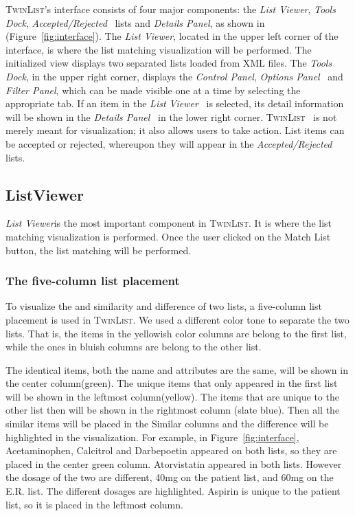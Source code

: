 \documentclass{chi2009}
\newcommand{\TwinList}{\textsc{TwinList}}
\newcommand{\ListViewer}{\textit{List Viewer}}
\newcommand{\AcceptedRejected}{\textit{Accepted/Rejected}}
\newcommand{\Details}{\textit{Details Panel}}
\newcommand{\Tools}{\textit{Tools Dock}}
\newcommand{\Controls}{\textit{Control Panel}}
\newcommand{\Filters}{\textit{Filter Panel}}
\newcommand{\Options}{\textit{Options Panel}}
\begin{document}
\TwinList's interface consists of four major components: the \ListViewer, \Tools, \AcceptedRejected~ lists and \Details, as shown in (Figure~\ref{fig:interface}). The \ListViewer, located in the upper left corner of the interface, is where the list matching visualization will be performed. The initialized view displays two separated lists loaded from XML files. The \Tools, in the upper right corner, displays the \Controls, \Options~ and \Filters, which can be made visible one at a time by selecting the appropriate tab. If an item in the \ListViewer~ is selected, its detail information will be shown in the \Details~ in the lower right corner. \TwinList~ is not merely meant for visualization; it also allows users to take action. List items can be accepted or rejected, whereupon they will appear in the \AcceptedRejected~ lists.

\subsection{ListViewer}
 \ListViewer is the most important component in \TwinList. It is where the list matching visualization is performed. Once the user clicked on the Match List button, the list matching will be performed.

\subsubsection{The five-column list placement}
To visualize the and similarity and difference of two lists, a five-column list placement is used in \TwinList. We used a different color tone to separate the two lists. That is, the items in the yellowish color columns are belong to the first list, while the ones in bluish columns are belong to the other list. 

The identical items, both the name and attributes are the same, will be shown in the center column(green). The unique items that only appeared in the first list will be shown in the leftmost column(yellow). The items that are unique to the other list then will be shown in the rightmost column (slate blue). Then all the similar items will be placed in the Similar columns and the difference will be highlighted in the visualization. For example, in Figure~\ref{fig:interface}, Acetaminophen, Calcitrol and Darbepoetin appeared on both lists, so they are placed in the center green column. Atorvistatin appeared in both lists. However the dosage of the two are different, 40mg on the patient list, and 60mg on the E.R. list. The different dosages are highlighted. Aspirin is unique to the patient list, so it is placed in the leftmost column.
\end{document}
